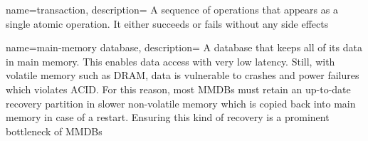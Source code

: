 %
%
%
%
%
%
%
%
%
%
%


{
    name=transaction,
    description={
        A sequence of operations that appears as a single atomic operation. It
        either succeeds or fails without any side effects
    }
}

{
    name=main-memory database,
    description={
        A database that keeps all of its data in main memory. This enables data
        access with very low latency. Still, with volatile memory such as
        \ac{DRAM}, data is vulnerable to crashes and power failures which
        violates ACID. For this reason, most \acp{MMDB} must retain an
        up-to-date recovery partition in slower non-volatile memory which is
        copied back into main memory in case of a restart. Ensuring this kind of
        recovery is a prominent bottleneck of \acp{MMDB}
    }
}
